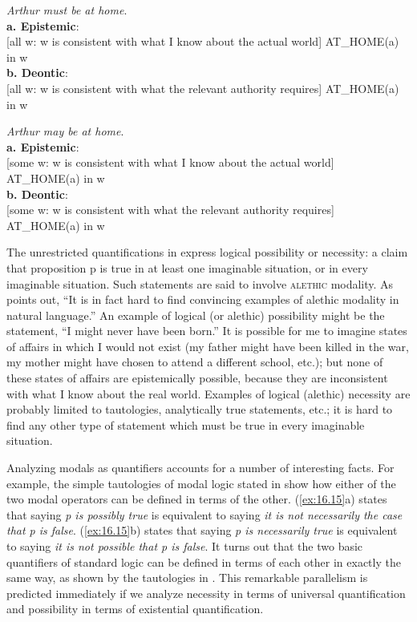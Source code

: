 \ea \label{ex:16.13}
\textit{Arthur must be at home}.\\
\textbf{a. Epistemic}:\\
{}[all w: w is consistent with what I know about the actual world] AT\_HOME(a) in w\\
\textbf{b. Deontic}:\\
{}[all w: w is consistent with what the relevant authority requires] AT\_HOME(a) in w
\z

\ea \label{ex:16.14}
\textit{Arthur may be at home}.\\
\textbf{a. Epistemic}:\\
{}[some w: w is consistent with what I know about the actual world] AT\_HOME(a) in w\\
\textbf{b. Deontic}:\\
{}[some w: w is consistent with what the relevant authority requires] AT\_HOME(a) in w
\z


The unrestricted quantifications in  express logical possibility or necessity: a claim that proposition p is true in at least one imaginable situation, or in every imaginable situation. Such statements are said to involve \textsc{alethic} modality. As  \citet{vonFintel2006} points out, “It is in fact hard to find convincing examples of alethic modality in natural language.” An example of logical (or alethic) possibility might be the statement, “I might never have been born.” It is possible for me to imagine states of affairs in which I would not exist (my father might have been killed in the war, my mother might have chosen to attend a different school, etc.); but none of these states of affairs are epistemically possible, because they are inconsistent with what I know about the real world. Examples of logical (alethic) necessity are probably limited to tautologies, analytically true statements, etc.; it is hard to find any other type of statement which must be true in every imaginable situation.



Analyzing modals as quantifiers accounts for a number of interesting facts. For example, the simple tautologies of modal logic stated in  show how either of the two modal operators can be defined in terms of the other. (\ref{ex:16.15}a) states that saying \textit{p is possibly true} is equivalent to saying \textit{it is not necessarily the case that p is false}. (\ref{ex:16.15}b) states that saying \textit{p is necessarily true} is equivalent to saying \textit{it is not possible that p is false}. It turns out that the two basic quantifiers of standard logic can be defined in terms of each other in exactly the same way, as shown by the tautologies in . This remarkable parallelism is predicted immediately if we analyze necessity in terms of universal quantification and possibility in terms of existential quantification.


